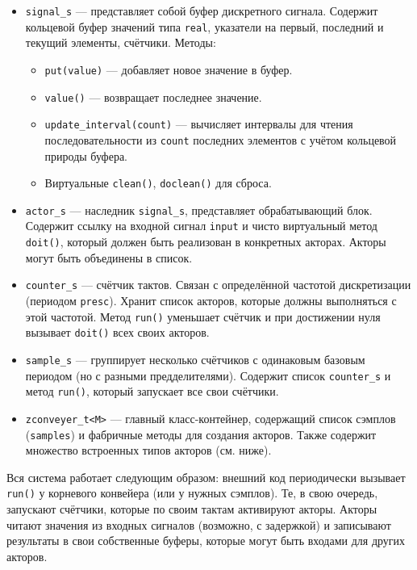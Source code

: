 \documentclass[a4paper,12pt]{article}
\begin{document}
\begin{itemize}
    \item \texttt{signal\_s} — представляет собой буфер дискретного сигнала. Содержит кольцевой буфер значений типа \texttt{real}, указатели на первый, последний и текущий элементы, счётчики. Методы:
        \begin{itemize}
            \item \texttt{put(value)} — добавляет новое значение в буфер.
            \item \texttt{value()} — возвращает последнее значение.
            \item \texttt{update\_interval(count)} — вычисляет интервалы для чтения последовательности из \texttt{count} последних элементов с учётом кольцевой природы буфера.
            \item Виртуальные \texttt{clean()}, \texttt{doclean()} для сброса.
        \end{itemize}
    \item \texttt{actor\_s} — наследник \texttt{signal\_s}, представляет обрабатывающий блок. Содержит ссылку на входной сигнал \texttt{input} и чисто виртуальный метод \texttt{doit()}, который должен быть реализован в конкретных акторах. Акторы могут быть объединены в список.
    \item \texttt{counter\_s} — счётчик тактов. Связан с определённой частотой дискретизации (периодом \texttt{presc}). Хранит список акторов, которые должны выполняться с этой частотой. Метод \texttt{run()} уменьшает счётчик и при достижении нуля вызывает \texttt{doit()} всех своих акторов.
    \item \texttt{sample\_s} — группирует несколько счётчиков с одинаковым базовым периодом (но с разными предделителями). Содержит список \texttt{counter\_s} и метод \texttt{run()}, который запускает все свои счётчики.
    \item \texttt{zconveyer\_t<M>} — главный класс-контейнер, содержащий список сэмплов (\texttt{samples}) и фабричные методы для создания акторов. Также содержит множество встроенных типов акторов (см. ниже).
\end{itemize}

Вся система работает следующим образом: внешний код периодически вызывает \texttt{run()} у корневого конвейера (или у нужных сэмплов). Те, в свою очередь, запускают счётчики, которые по своим тактам активируют акторы. Акторы читают значения из входных сигналов (возможно, с задержкой) и записывают результаты в свои собственные буферы, которые могут быть входами для других акторов.
\end{document}
